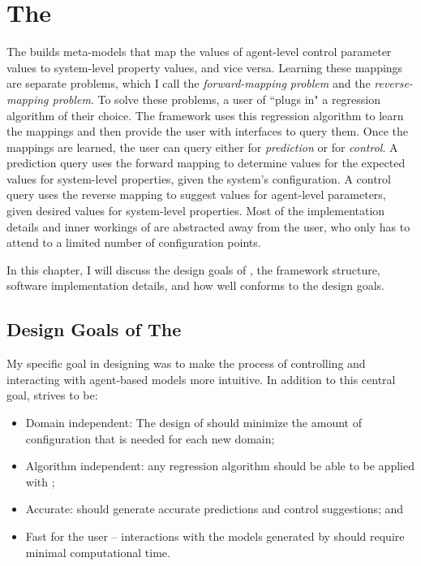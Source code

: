 \chapter{The \FRAMEWORK}
\thispagestyle{plain}

\label{Framework}

The \framework builds meta-models that map the values of agent-level control parameter values to system-level property values, and vice versa.
Learning these mappings are separate problems, which I call the \textit{forward-mapping problem} and the \textit{reverse-mapping problem}.
To solve these problems, a user of \fw ``plugs in" a regression algorithm of their choice.
The framework uses this regression algorithm to learn the mappings and then provide the user with interfaces to query them.
Once the mappings are learned, the user can query either for \textit{prediction} or for \textit{control}.
A prediction query uses the forward mapping to determine values for the expected values for system-level properties, given the system's configuration.
A control query uses the reverse mapping to suggest values for agent-level parameters, given desired values for system-level properties.
Most of the implementation details and inner workings of \fw are abstracted away from the user, who only has to attend to a limited number of configuration points.

In this chapter, I will discuss the design goals of \fw, the framework structure, software implementation details, and how well \fw conforms to the design goals.


\section{Design Goals of The \framework}

My specific goal in designing \fw was to make the process of controlling and interacting with agent-based models more intuitive.
In addition to this central goal, \fw strives to be:
\begin{itemize}
  \item Domain independent: The design of \fw should minimize the amount of configuration that is needed for each new domain;
  \item Algorithm independent: any regression algorithm should be able to be applied with \fw;
  \item Accurate: \fw should generate accurate predictions and control suggestions; and
  \item Fast for the user -- interactions with the models generated by \fw should require minimal computational time.
\end{itemize}

